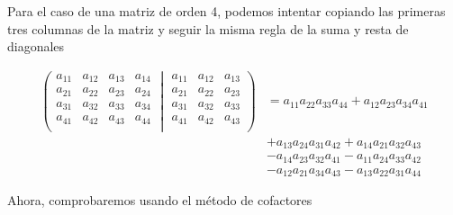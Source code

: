 \documentclass{article}
\begin{document}
Para el caso de una matriz de orden 4, podemos intentar copiando las primeras tres columnas de la matriz y seguir la misma regla de la suma y resta de diagonales

\begin{equation}
    \begin{aligned}
        \left(
        \begin{matrix}
            a_{11} & a_{12} & a_{13} & a_{14} \\
            a_{21} & a_{22} & a_{23} & a_{24} \\
            a_{31} & a_{32} & a_{33} & a_{34} \\
            a_{41} & a_{42} & a_{43} & a_{44} \\
        \end{matrix}
        \middle|
        \begin{matrix}
            a_{11} & a_{12} & a_{13} \\
            a_{21} & a_{22} & a_{23} \\
            a_{31} & a_{32} & a_{33} \\
            a_{41} & a_{42} & a_{43} \\
        \end{matrix} 
        \right)
        & = a_{11}a_{22}a_{33}a_{44} + a_{12}a_{23}a_{34}a_{41} \\
        & + a_{13}a_{24}a_{31}a_{42} + a_{14}a_{21}a_{32}a_{43} \\
        & - a_{14}a_{23}a_{32}a_{41} - a_{11}a_{24}a_{33}a_{42} \\
        & - a_{12}a_{21}a_{34}a_{43} - a_{13}a_{22}a_{31}a_{44}
    \end{aligned}
\end{equation}

Ahora, comprobaremos usando el método de cofactores
\end{document}
